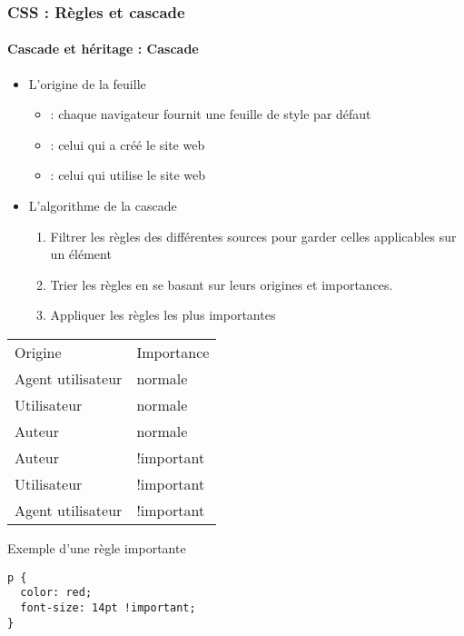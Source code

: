 \documentclass[xcolor=table]{beamer}
\begin{document}
\begin{frame}[fragile]
\frametitle{CSS : Règles et cascade}
\framesubtitle{Cascade et héritage : Cascade}

\begin{minipage}{0.60\textwidth}
	\begin{itemize}
		\item L'origine de la feuille
		\begin{itemize}
			\item {} : chaque navigateur fournit une feuille de style par défaut
			\item {} : celui qui a créé le site web 
			\item {} : celui qui utilise le site web 
		\end{itemize}
		\item L'algorithme de la cascade
		\begin{enumerate}
			\item Filtrer les règles des différentes sources pour garder celles applicables sur un élément
			\item Trier les règles en se basant sur leurs origines et importances.
			\item Appliquer les règles les plus importantes 
		\end{enumerate}
	\end{itemize}
\end{minipage}
%
\begin{minipage}{0.38\textwidth}
\begin{center}
	\scriptsize\bfseries
	\begin{tabular}{ll}
		\rowcolor{darkblue}
		\color{white}Origine & \color{white}Importance\\
		Agent utilisateur & normale\\
		Utilisateur & normale\\
		Auteur & normale\\
		Auteur & !important\\
		Utilisateur & !important\\
		Agent utilisateur & !important\\
	\end{tabular}
\end{center}
\begin{exampleblock}{Exemple d'une règle importante}
\lstset{escapeinside=**}
\tiny\bfseries
\begin{lstlisting}[language={HTML5}]
p {
  color: red;
  font-size: 14pt !important;
}
\end{lstlisting}
\end{exampleblock}
\end{minipage}
\end{frame}
\end{document}
